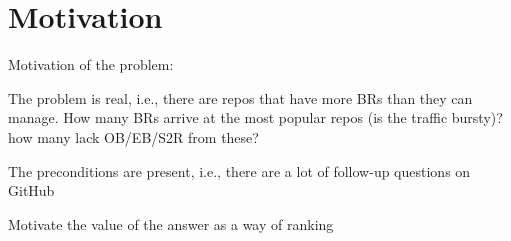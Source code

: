 \section{Motivation}



Motivation of the problem:

The problem is real, i.e., there are repos that have more BRs than they can manage. How many BRs arrive at the most popular repos (is the traffic bursty)? how many lack OB/EB/S2R from these?

The preconditions are present, i.e., there are a lot of follow-up questions on GitHub


Motivate the value of the answer as a way of ranking
